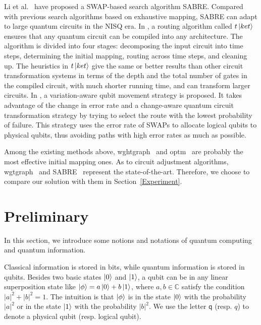 \documentclass[journal]{IEEEtran}
\begin{document}
\begin{itemize}
		Li et al.~\cite{Li2018} have proposed a SWAP-based search algorithm SABRE. Compared with previous search algorithms based on exhaustive mapping, SABRE
		can adapt to large quantum circuits in the NISQ era. In \cite{Cowtan2019}, a routing algorithm called $t\left\vert{ket}\right\rangle$  ensures that any quantum circuit can be compiled into any architecture. The algorithm is divided into four stages: decomposing the input circuit into time steps, determining the initial mapping, routing across time steps, and cleaning up. The heuristics in $t\left\vert{ket}\right\rangle$ give the same or better results than other circuit transformation systems in terms of the depth and the total number of gates in the compiled circuit, with much shorter running time, and can transform larger circuits. In \cite{Tannu2019},  a variation-aware qubit movement strategy is proposed. It takes advantage of the change in error rate and a change-aware quantum circuit transformation strategy by trying to select the route with the lowest probability of failure. This strategy uses the error rate of  SWAPs to allocate logical qubits to physical qubits, thus avoiding paths with high error rates as much as possible.
	\end{itemize}
	
	Among the existing methods above, wghtgraph~\cite{2020Qubit} and optm~\cite{Zulehner2017} are probably the most effective initial mapping ones. As to circuit adjustment algorithms, wgtgraph~\cite{2020Qubit} and SABRE~\cite{Li2018} represent the state-of-the-art. Therefore, we choose to compare our solution with them in Section~\ref{Experiment}.
	
	
	\section{Preliminary}
	\label{Background}
	In this section, we introduce some notions and notations of quantum computing and quantum information.
	
	Classical information is stored in bits, while quantum information is stored in qubits. 
	Besides two basic states $\left\vert{0}\right\rangle$ and $\left\vert{1}\right\rangle$,
	a qubit can be in any linear superposition state like $\left\vert{\phi}\right\rangle=a\left\vert{0}\right\rangle+b\left\vert{1}\right\rangle$,
	where $a,b\in \mathbb{C}$ satisfy the condition $|a|^{2}+|b|^{2}=1$.
	The intuition is that $\left\vert{\phi}\right\rangle$ is in the state $\left\vert{0}\right\rangle$ with the probability $|a|^{2}$ or in the state $\left\vert{1}\right\rangle$ with the probability $|b|^{2}$.
	We use the letter $\textsf{q}$ (resp. $\textit{q}$) to denote a physical qubit (resp. logical qubit).
	
\end{document}
